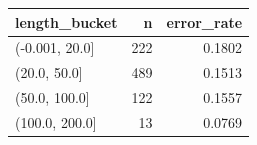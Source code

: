 \begin{tabular}{lrr}
\toprule
length\_bucket & n & error\_rate \\
\midrule
(-0.001, 20.0] & 222 & 0.1802 \\
(20.0, 50.0] & 489 & 0.1513 \\
(50.0, 100.0] & 122 & 0.1557 \\
(100.0, 200.0] & 13 & 0.0769 \\
\bottomrule
\end{tabular}
